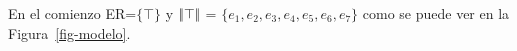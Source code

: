 





En el comienzo ER=$\{\top\}$ y $|\!|\top|\!|$ = $\{e_1, e_2, e_3, e_4, e_5, e_6, e_7\}$ como se puede ver en la Figura~\ref{fig-modelo}.\\


